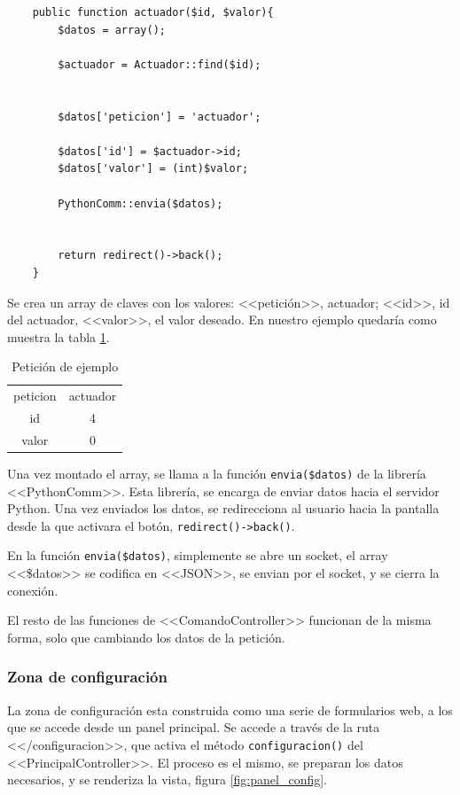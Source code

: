     \begin{lstlisting}
    public function actuador($id, $valor){
        $datos = array();
    
        $actuador = Actuador::find($id);
    
    
        $datos['peticion'] = 'actuador';
    
        $datos['id'] = $actuador->id;
        $datos['valor'] = (int)$valor;
    
        PythonComm::envia($datos);
    
    
        return redirect()->back();
    }
    \end{lstlisting}
    
    Se crea un array de claves con los valores: <<petición>>, actuador; <<id>>, id del actuador, <<valor>>, el valor deseado. En nuestro ejemplo quedaría como muestra la tabla \ref{tab:pet_ejem}.
    
    \begin{table}[h]
        \centering
        \begin{tabular}{c|c}
            \toprule
            peticion & actuador  \\ 
            id & 4       \\ 
            valor & 0    \\\bottomrule
        \end{tabular}
        \caption{Petición de ejemplo}
        \label{tab:pet_ejem}
    \end{table}
    
    Una vez montado el array, se llama a la función \lstinline|envia($datos)| de la librería <<PythonComm>>. Esta librería, se encarga de enviar datos hacia el servidor Python. Una vez enviados los datos, se redirecciona al usuario hacia la pantalla desde la que activara el botón, \lstinline|redirect()->back()|.
    
    En la función \lstinline|envia($datos)|, simplemente se abre un socket, el array <<\$datos>> se codifica en <<JSON>>, se envian por el socket, y se cierra la conexión. 
    
    El resto de las funciones de <<ComandoController>> funcionan de la misma forma, solo que cambiando los datos de la petición.
    
   
    \subsubsection{Zona de configuración}
    
    La zona de configuración esta construida como una serie de formularios web, a los que se accede desde un panel principal. Se accede a través de la ruta <</configuracion>>, que activa el método \lstinline|configuracion()| del <<PrincipalController>>. El proceso es el mismo, se preparan los datos necesarios, y se renderiza la vista, figura \ref{fig:panel_config}.
    
